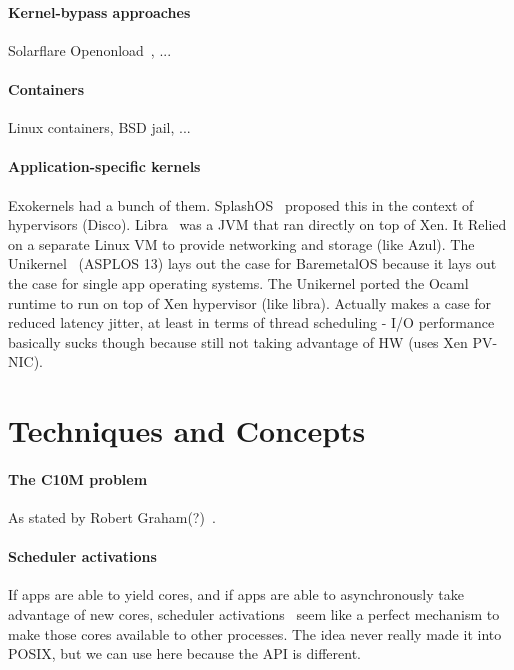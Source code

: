 \paragraph*{Kernel-bypass approaches}  Solarflare Openonload~\cite{openonload}, ...

\paragraph*{Containers}  Linux containers, BSD jail, ...


\paragraph*{Application-specific kernels}  
Exokernels had a bunch of them.
SplashOS~\cite{DBLP:journals/tocs/BugnionDGR97} proposed this in the
context of hypervisors (Disco).
Libra~\cite{DBLP:conf/vee/AmmonsABSGKKRHW07} was a JVM that ran
directly on top of Xen.  It Relied on a separate Linux VM to provide
networking and storage (like Azul).  The
Unikernel~\cite{DBLP:conf/asplos/MadhavapeddyMRSSGSHC13} (ASPLOS 13)
lays out the case for BaremetalOS because it lays out the case for
single app operating systems.  The Unikernel ported the Ocaml runtime
to run on top of Xen hypervisor (like libra).  Actually makes a case
for reduced latency jitter, at least in terms of thread scheduling -
I/O performance basically sucks though because still not taking
advantage of HW (uses Xen PV-NIC).

\section{Techniques and Concepts}

\paragraph*{The C10M problem} As stated by Robert Graham(?)~\cite{theC10Mproblem}.


\paragraph*{Scheduler activations} 
If apps are able to yield cores, and if apps are able to
asynchronously take advantage of new cores, scheduler
activations~\cite{DBLP:journals/tocs/AndersonBLL92} seem like a
perfect mechanism to make those cores available to other processes. 
The idea never really made it into POSIX, but we can use here because the API is different. 

